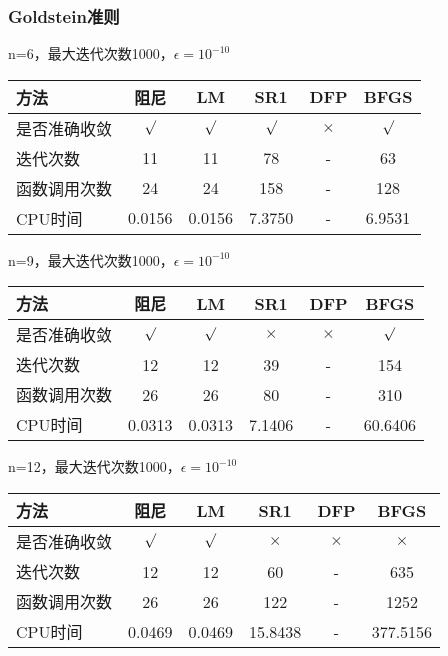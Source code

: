 \documentclass[11pt, a4paper]{article}
\begin{document}
\subsubsection{Goldstein准则}

n=6，最大迭代次数1000，$\epsilon=10^{-10}$

\vspace{10pt}
\begin{tabular}{|l|c|c|c|c|c|}
	\hline
	方法 & 阻尼 & LM & SR1 & DFP & BFGS \\\hline
	是否准确收敛 & $\surd$ & $\surd$ & $\surd$ & $\times$ & $\surd$ \\\hline
	迭代次数 & 11 & 11 & 78 & - & 63 \\\hline
	函数调用次数 & 24 & 24 & 158 & - & 128 \\\hline
	CPU时间 & 0.0156 & 0.0156 & 7.3750 & - & 6.9531\\\hline
\end{tabular}

\vspace{20pt}
n=9，最大迭代次数1000，$\epsilon=10^{-10}$

\vspace{10pt}
\begin{tabular}{|l|c|c|c|c|c|}
	\hline
	方法 & 阻尼 & LM & SR1 & DFP & BFGS \\\hline
	是否准确收敛 & $\surd$ & $\surd$ & $\times$ & $\times$ & $\surd$ \\\hline
	迭代次数 & 12 & 12 & 39 & - & 154 \\\hline
	函数调用次数 & 26 & 26 & 80 & - & 310 \\\hline
	CPU时间 & 0.0313 & 0.0313 & 7.1406 & - & 60.6406\\\hline
\end{tabular}

\vspace{20pt}
n=12，最大迭代次数1000，$\epsilon=10^{-10}$

\vspace{10pt}
\begin{tabular}{|l|c|c|c|c|c|}
	\hline
	方法 & 阻尼 & LM & SR1 & DFP & BFGS \\\hline
	是否准确收敛 & $\surd$ & $\surd$ & $\times$ & $\times$ & $\times$ \\\hline
	迭代次数 & 12 & 12 & 60 & - & 635 \\\hline
	函数调用次数 & 26 & 26 & 122 & - & 1252 \\\hline
	CPU时间 & 0.0469 & 0.0469 & 15.8438 & - & 377.5156\\\hline
\end{tabular}
\end{document}
